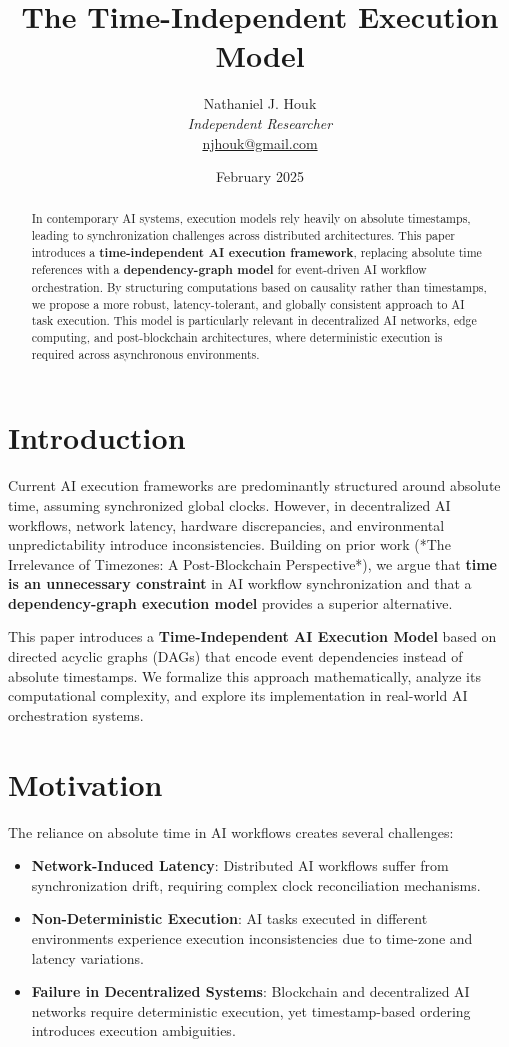 \documentclass{article}
\title{The Time-Independent Execution Model}
\author{Nathaniel J. Houk\\
\textit{Independent Researcher}\\
\href{mailto:njhouk@gmail.com}{njhouk@gmail.com}}
\date{February 2025}
\begin{document}
\maketitle
\tableofcontents

\begin{abstract}
In contemporary AI systems, execution models rely heavily on absolute timestamps, leading to synchronization challenges across distributed architectures. This paper introduces a \textbf{time-independent AI execution framework}, replacing absolute time references with a \textbf{dependency-graph model} for event-driven AI workflow orchestration. By structuring computations based on causality rather than timestamps, we propose a more robust, latency-tolerant, and globally consistent approach to AI task execution. This model is particularly relevant in decentralized AI networks, edge computing, and post-blockchain architectures, where deterministic execution is required across asynchronous environments.
\end{abstract}

\section{Introduction}
Current AI execution frameworks are predominantly structured around absolute time, assuming synchronized global clocks. However, in decentralized AI workflows, network latency, hardware discrepancies, and environmental unpredictability introduce inconsistencies. Building on prior work (*The Irrelevance of Timezones: A Post-Blockchain Perspective*), we argue that \textbf{time is an unnecessary constraint} in AI workflow synchronization and that a \textbf{dependency-graph execution model} provides a superior alternative.

This paper introduces a \textbf{Time-Independent AI Execution Model} based on directed acyclic graphs (DAGs) that encode event dependencies instead of absolute timestamps. We formalize this approach mathematically, analyze its computational complexity, and explore its implementation in real-world AI orchestration systems.

\section{Motivation}
The reliance on absolute time in AI workflows creates several challenges:
\begin{itemize}
    \item \textbf{Network-Induced Latency}: Distributed AI workflows suffer from synchronization drift, requiring complex clock reconciliation mechanisms.
    \item \textbf{Non-Deterministic Execution}: AI tasks executed in different environments experience execution inconsistencies due to time-zone and latency variations.
    \item \textbf{Failure in Decentralized Systems}: Blockchain and decentralized AI networks require deterministic execution, yet timestamp-based ordering introduces execution ambiguities.
\end{itemize}
\end{document}
